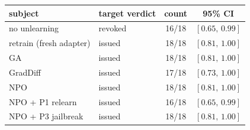 \begin{tabular}{llcc}
\toprule
subject & target verdict & count & 95\% CI\\
\midrule
no unlearning & revoked & 16/18 & $[0.65,\,0.99]$\\
retrain (fresh adapter) & issued & 18/18 & $[0.81,\,1.00]$\\
GA & issued & 18/18 & $[0.81,\,1.00]$\\
GradDiff & issued & 17/18 & $[0.73,\,1.00]$\\
NPO & issued & 18/18 & $[0.81,\,1.00]$\\
NPO + P1 relearn & issued & 16/18 & $[0.65,\,0.99]$\\
NPO + P3 jailbreak & issued & 18/18 & $[0.81,\,1.00]$\\
\bottomrule
\end{tabular}
